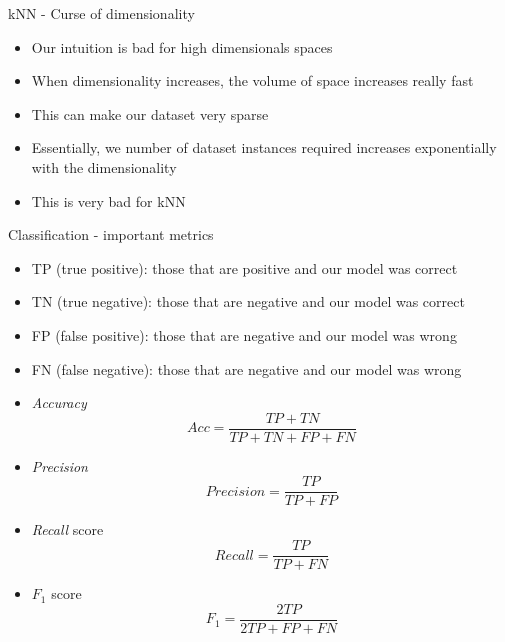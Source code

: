 \documentclass[aspectratio=169]{beamer}
\begin{document}
\begin{frame}{kNN - Curse of dimensionality}
    \begin{itemize}
        \item Our intuition is bad for high dimensionals spaces
        \item When dimensionality increases, the volume of space increases really fast
        \item This can make our dataset very sparse
        \item Essentially, we number of dataset instances required increases exponentially with the dimensionality
        \item This is very bad for kNN
    \end{itemize}
\end{frame}
\begin{frame}{Classification - important metrics}
    \begin{itemize}
        \item TP (true positive): those that are positive and our model was correct
        \item TN (true negative): those that are negative and our model was correct
        \item FP (false positive): those that are negative and our model was wrong
        \item FN (false negative): those that are negative and our model was wrong
        \item \textit{Accuracy}
            $$ Acc = \frac{TP + TN}{TP + TN + FP + FN} $$
        \item \textit{Precision}
            $$ Precision = \frac{TP}{TP + FP} $$
        \item \textit{Recall} score
            $$ Recall = \frac{TP}{TP + FN} $$
        \item $F_1$ score
            $$ F_1 = \frac{2TP}{2TP + FP + FN} $$
    \end{itemize}
\end{frame}

\end{document}
